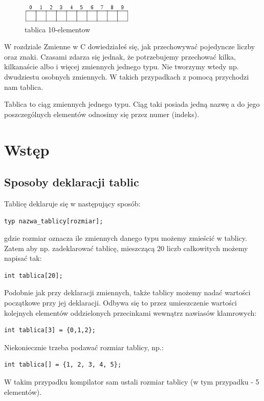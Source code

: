 \documentclass[a4paper,12pt]{article}
\begin{document}
\begin{figure}
\begin{center}
\includegraphics[width=0.48\textwidth]{pic1.png}
\end{center}
\caption{tablica 10-elementow}
\label{Etykieta}
\end{figure}

W rozdziale Zmienne w C dowiedziałeś się, jak przechowywać pojedyncze liczby oraz znaki. Czasami zdarza się jednak, że potrzebujemy przechować kilka, kilkanaście albo i więcej zmiennych jednego typu. Nie tworzymy wtedy np. dwudziestu osobnych zmiennych. W takich przypadkach z pomocą przychodzi nam tablica.



Tablica to ciąg zmiennych jednego typu. Ciąg taki posiada jedną nazwę a do jego poszczególnych elementów odnosimy się przez numer (indeks).

\section*{Wstęp}

\subsection*{Sposoby deklaracji tablic}

Tablicę deklaruje się w następujący sposób:
\begin{lstlisting}[caption=Deklaracja, captionpos=t, label=src:sqrt, frame=lBTr, frameround=ffff, captionpos=b]
typ nazwa_tablicy[rozmiar];
\end{lstlisting}
gdzie rozmiar oznacza ile zmiennych danego typu możemy zmieścić w tablicy. Zatem aby np. zadeklarować tablicę, mieszczącą 20 liczb całkowitych możemy napisać tak:
\begin{lstlisting}[caption=Deklaracja tablicy 20 int, captionpos=t, label=src:sqrt, frame=lBTr, frameround=ffff, captionpos=b]
int tablica[20];
\end{lstlisting}
Podobnie jak przy deklaracji zmiennych, także tablicy możemy nadać wartości początkowe przy jej deklaracji. Odbywa się to przez umieszczenie wartości kolejnych elementów oddzielonych przecinkami wewnątrz nawiasów klamrowych:
\begin{lstlisting}[caption=Inicjalizacja, captionpos=t, label=src:sqrt, frame=lBTr, frameround=ffff, captionpos=b ]
 int tablica[3] = {0,1,2};
\end{lstlisting}
Niekoniecznie trzeba podawać rozmiar tablicy, np.:
\begin{lstlisting}[caption=Inicjalizacja bez rozmiaru, captionpos=t, label=src:sqrt, frame=lBTr, frameround=ffff, captionpos=b ]
 int tablica[] = {1, 2, 3, 4, 5};
\end{lstlisting}
W takim przypadku kompilator sam ustali rozmiar tablicy (w tym przypadku - 5 elementów).
\end{document}
